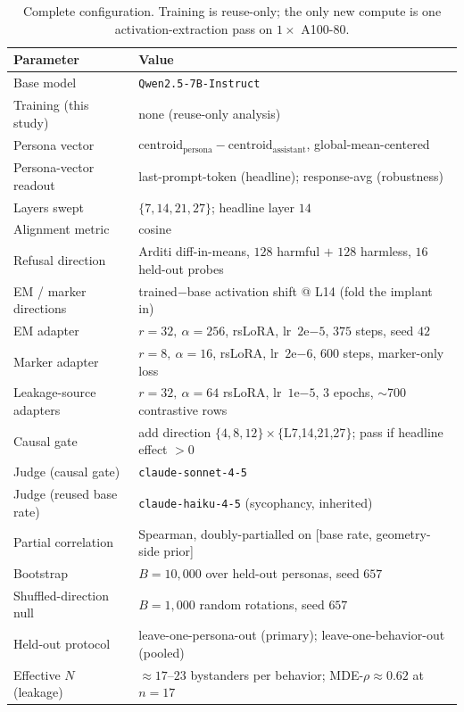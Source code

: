 \documentclass[11pt]{article}
\let\mathrho\rho
\renewcommand{\rho}{\ensuremath{\mathrho}}
\begin{document}
\begin{table}[t]
\centering
\small
\caption{Complete configuration. Training is reuse-only; the only new compute is one
activation-extraction pass on $1\times$ A100-80.}
\label{tab:hparams}
\begin{tabular}{ll}
\toprule
Parameter & Value \\
\midrule
Base model & \texttt{Qwen2.5-7B-Instruct} \\
Training (this study) & none (reuse-only analysis) \\
Persona vector & $\text{centroid}_{\text{persona}}-\text{centroid}_{\text{assistant}}$, global-mean-centered \\
Persona-vector readout & last-prompt-token (headline); response-avg (robustness) \\
Layers swept & $\{7,14,21,27\}$; headline layer $14$ \\
Alignment metric & cosine \\
Refusal direction & Arditi diff-in-means, $128$ harmful $+$ $128$ harmless, $16$ held-out probes \\
EM / marker directions & trained$-$base activation shift @ L14 (fold the implant in) \\
EM adapter & $r{=}32,\ \alpha{=}256$, rsLoRA, lr~$2\mathrm{e}{-5}$, $375$ steps, seed $42$ \\
Marker adapter & $r{=}8,\ \alpha{=}16$, rsLoRA, lr~$2\mathrm{e}{-6}$, $600$ steps, marker-only loss \\
Leakage-source adapters & $r{=}32,\ \alpha{=}64$ rsLoRA, lr~$1\mathrm{e}{-5}$, $3$ epochs, $\sim$700 contrastive rows \\
Causal gate & add direction $\{4,8,12\}\times\{$L7,14,21,27$\}$; pass if headline effect $>0$ \\
Judge (causal gate) & \texttt{claude-sonnet-4-5} \\
Judge (reused base rate) & \texttt{claude-haiku-4-5} (sycophancy, inherited) \\
Partial correlation & Spearman, doubly-partialled on [base rate, geometry-side prior] \\
Bootstrap & $B{=}10{,}000$ over held-out personas, seed $657$ \\
Shuffled-direction null & $B{=}1{,}000$ random rotations, seed $657$ \\
Held-out protocol & leave-one-persona-out (primary); leave-one-behavior-out (pooled) \\
Effective $N$ (leakage) & $\approx 17$--$23$ bystanders per behavior; MDE-$\rho \approx 0.62$ at $n{=}17$ \\
\bottomrule
\end{tabular}
\end{table}
\end{document}
